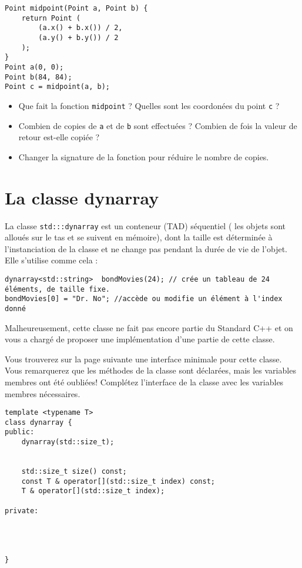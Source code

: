 \documentclass[9pt]{article}
\begin{document}
\qn

\begin{lstlisting}
Point midpoint(Point a, Point b) {
	return Point (
		(a.x() + b.x()) / 2,
		(a.y() + b.y()) / 2
	);
}
Point a(0, 0);
Point b(84, 84);
Point c = midpoint(a, b);
\end{lstlisting}


\begin{itemize}
\item Que fait la fonction  \lstinline{midpoint} ? Quelles sont les coordonées du point \lstinline{c} ?
\item Combien de copies de \lstinline{a} et de \lstinline{b} sont effectuées ? Combien de fois la valeur de retour est-elle copiée ?
\item Changer la signature de la fonction pour réduire le nombre de copies. 
\end{itemize}


\section{La classe dynarray}

La classe \lstinline{std:::dynarray} est un conteneur (TAD) séquentiel ( les objets sont alloués sur le tas et se suivent en mémoire), dont la taille est déterminée à l'instanciation de la classe et ne change pas pendant la durée de vie de l'objet.
Elle s'utilise comme cela :

\begin{lstlisting}
dynarray<std::string>  bondMovies(24); // crée un tableau de 24 éléments, de taille fixe.
bondMovies[0] = "Dr. No"; //accède ou modifie un élément à l'index donné
\end{lstlisting}

Malheureusement, cette classe ne fait pas encore partie du Standard C++ et on vous a chargé de proposer une implémentation d'une partie de cette classe.

\qn
Vous trouverez sur la page suivante une interface minimale pour cette classe. Vous remarquerez que les méthodes de la classe sont déclarées, mais les variables membres ont été oubliées! Complétez l'interface de la classe avec les variables membres nécessaires.  

\newpage

\begin{lstlisting}
template <typename T>
class dynarray {
public:
	dynarray(std::size_t);

	
	std::size_t size() const;
	const T & operator[](std::size_t index) const;
	T & operator[](std::size_t index);

private:
	
	
	
	
}
\end{lstlisting}
\end{document}

